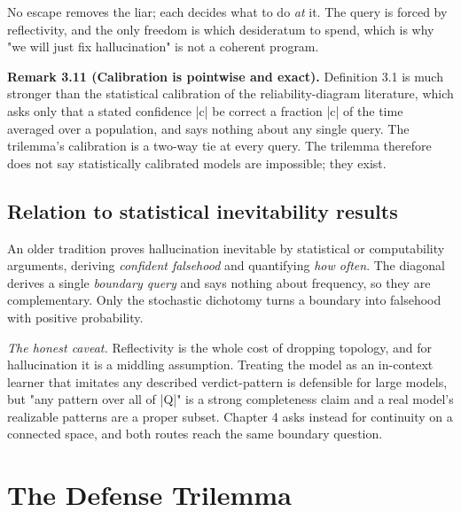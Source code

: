 \documentclass{memoir}
\begin{document}
No escape removes the liar; each decides what to do \emph{at} it. The query is forced
by reflectivity, and the only freedom is which desideratum to spend, which is
why "we will just fix hallucination" is not a coherent program.

\textbf{Remark 3.11 (Calibration is pointwise and exact).} Definition 3.1 is much stronger
than the statistical calibration of the reliability-diagram literature, which
asks only that a stated confidence \LeanVerb|c| be correct a fraction \LeanVerb|c| of the time
averaged over a population, and says nothing about any single query. The
trilemma's calibration is a two-way tie at every query. The trilemma therefore
does not say statistically calibrated models are impossible; they exist.



\subsection{Relation to statistical inevitability results}\label{Two--Schemas--of--Impossibility-005F-005F-005F--Machine--Checked--Limits--of--Trustworthy--Machine--Learning-005F-005F-005F--and--Why--They--Tighten--with--Capability----Three--Trilemmata-005F-005F-005F--One--Theorem----The--Hallucination--Trilemma----Relation--to--statistical--inevitability--results}

An older tradition proves hallucination inevitable by statistical or
computability arguments, deriving \emph{confident falsehood} and quantifying \emph{how
often}. The diagonal derives a single \emph{boundary query} and says nothing about
frequency, so they are complementary. Only the stochastic dichotomy turns a
boundary into falsehood with positive probability.

\emph{The honest caveat.} Reflectivity is the whole cost of dropping topology, and
for hallucination it is a middling assumption. Treating the model as an
in-context learner that imitates any described verdict-pattern is defensible for
large models, but "any pattern over all of \LeanVerb|Q|" is a strong completeness claim
and a real model's realizable patterns are a proper subset. Chapter 4 asks
instead for continuity on a connected space, and both routes reach the same
boundary question.



\section{The Defense Trilemma}\label{Two--Schemas--of--Impossibility-005F-005F-005F--Machine--Checked--Limits--of--Trustworthy--Machine--Learning-005F-005F-005F--and--Why--They--Tighten--with--Capability----Three--Trilemmata-005F-005F-005F--One--Theorem----The--Defense--Trilemma}
\end{document}
